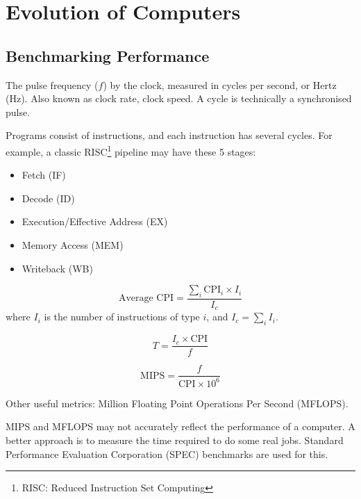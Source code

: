 \section{Evolution of Computers}

\subsection{Benchmarking Performance}

\begin{definition}
    The pulse frequency ($f$) by the clock, measured in cycles per
    second, or Hertz (Hz). Also known as clock rate, clock speed.
    A cycle is technically a synchronised pulse.
\end{definition}

Programs consist of instructions, and each instruction has several cycles.
For example, a classic RISC\footnote{RISC: Reduced Instruction Set Computing} pipeline
may have these 5 stages:
\begin{itemize}
    \item Fetch (IF)
    \item Decode (ID)
    \item Execution/Effective Address (EX)
    \item Memory Access (MEM)
    \item Writeback (WB)
\end{itemize}

\begin{definition} \label{def:average-cpi}
\begin{equation*}
    \text{Average CPI} = \frac{\sum_i \text{CPI}_i\times I_i}{I_c}
\end{equation*}
where $I_i$ is the number of instructions of type $i$, and $I_c = \sum_i I_i$.
\end{definition}

\begin{definition}\label{def:processor-time}
\begin{equation*}
    T = \frac{I_c \times \text{CPI}}{f}
\end{equation*}
\end{definition}

\begin{definition}\label{def:mips}
\begin{equation*}
    \text{MIPS} = \frac{f}{\text{CPI}\times 10^6}
\end{equation*}
\end{definition}

Other useful metrics: Million Floating Point Operations Per Second (MFLOPS).

\begin{remark}
    MIPS and MFLOPS may not accurately reflect the performance of a computer.
    A better approach is to measure the time required to do some real jobs.
    Standard Performance Evaluation Corporation (SPEC) benchmarks are used for this.
\end{remark}